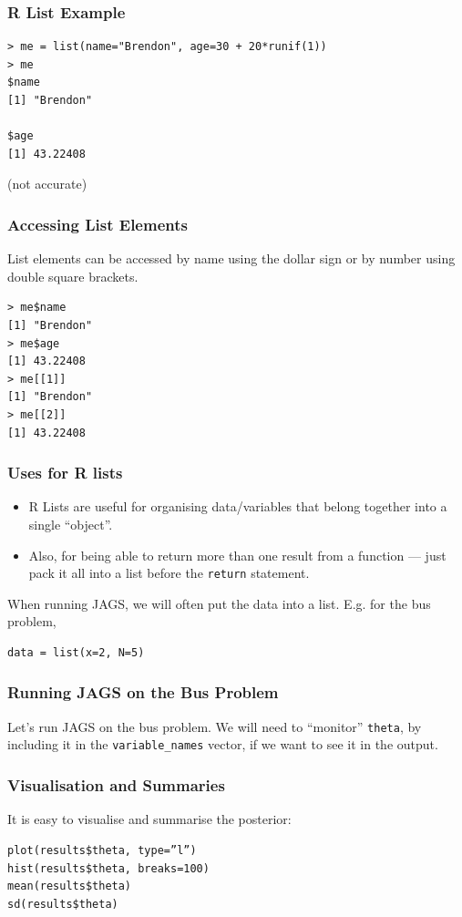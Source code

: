 \documentclass{beamer}
\begin{document}
\begin{frame}[fragile]
\frametitle{R List Example}
\begin{verbatim}
> me = list(name="Brendon", age=30 + 20*runif(1))
> me
$name
[1] "Brendon"

$age
[1] 43.22408
\end{verbatim}
(not accurate)
\end{frame}


\begin{frame}[fragile]
\frametitle{Accessing List Elements}
List elements can be accessed by name using the dollar sign
or by number using double square brackets.
\begin{verbatim}
> me$name
[1] "Brendon"
> me$age
[1] 43.22408
> me[[1]]
[1] "Brendon"
> me[[2]]
[1] 43.22408
\end{verbatim}
\end{frame}


\begin{frame}[fragile]
\frametitle{Uses for R lists}
\begin{itemize}
\item R Lists are useful for organising data/variables that
belong together into a single ``object''.\pause
\item Also, for being able to return more than one result from
a function --- just pack it all into a list before the
\texttt{return} statement.
\end{itemize}

\pause
When running JAGS, we will often put the data into a list.
E.g. for the bus problem,
\begin{verbatim}
data = list(x=2, N=5)
\end{verbatim}
\end{frame}


\begin{frame}[fragile]
\frametitle{Running JAGS on the Bus Problem}
Let's run JAGS on the bus problem. We will need to ``monitor''
\texttt{theta}, by including it in the \texttt{variable_names}
vector, if we want to see it in the output.

\end{frame}



\begin{frame}[fragile]
\frametitle{Visualisation and Summaries}
It is easy to visualise and summarise the posterior:

\begin{verbatim}
plot(results$theta, type=”l”)
hist(results$theta, breaks=100)
mean(results$theta)
sd(results$theta)
\end{verbatim}

\end{frame}
\end{document}
